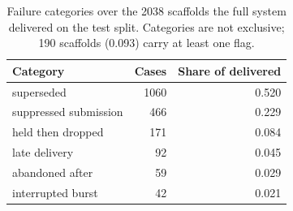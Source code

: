 \begin{table}[t]
\centering
\caption{Failure categories over the 2038 scaffolds the full system delivered on the test
split. Categories are not exclusive; 190 scaffolds (0.093) carry at least one flag.}
\label{tab:failures}
\begin{tabular}{lrr}
\toprule
Category & Cases & Share of delivered \\
\midrule
superseded & 1060 & 0.520 \\
suppressed submission & 466 & 0.229 \\
held then dropped & 171 & 0.084 \\
late delivery & 92 & 0.045 \\
abandoned after & 59 & 0.029 \\
interrupted burst & 42 & 0.021 \\
\bottomrule
\end{tabular}
\end{table}
